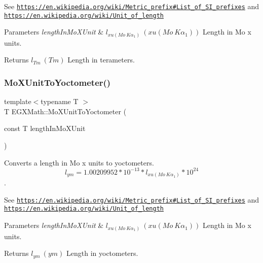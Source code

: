 See \href{https://en.wikipedia.org/wiki/Metric_prefix#List_of_SI_prefixes}{\tt https\+://en.\+wikipedia.\+org/wiki/\+Metric\+\_\+prefix\#\+List\+\_\+of\+\_\+\+S\+I\+\_\+prefixes} and \href{https://en.wikipedia.org/wiki/Unit_of_length}{\tt https\+://en.\+wikipedia.\+org/wiki/\+Unit\+\_\+of\+\_\+length} 
\begin{DoxyParams}{Parameters}
{\em length\+In\+Mo\+X\+Unit} & $ l_{xu(Mo\ K\alpha_1)}\ (xu(Mo\ K\alpha_1))$ Length in Mo x units. \\
\hline
\end{DoxyParams}
\begin{DoxyReturn}{Returns}
$ l_{Tm}\ (Tm)$ Length in terameters. 
\end{DoxyReturn}
\mbox{\label{group___e_g_x_math-_conversions-_length_conversions-_non-_s_i-_mo_x_unit-_s_i_gadfb737fe68fc22991e2c7616212480b6}} 
\subsubsection{\texorpdfstring{Mo\+X\+Unit\+To\+Yoctometer()}{MoXUnitToYoctometer()}}
{\footnotesize\ttfamily template$<$typename T $>$ \\
T E\+G\+X\+Math\+::\+Mo\+X\+Unit\+To\+Yoctometer (\begin{DoxyParamCaption}\item[{const T}]{length\+In\+Mo\+X\+Unit }\end{DoxyParamCaption})}



Converts a length in Mo x units to yoctometers. \[ l_{ym}=1.00209952*10^{-13} * l_{xu(Mo\ K\alpha_1)} * 10^{24} \]. 

See \href{https://en.wikipedia.org/wiki/Metric_prefix#List_of_SI_prefixes}{\tt https\+://en.\+wikipedia.\+org/wiki/\+Metric\+\_\+prefix\#\+List\+\_\+of\+\_\+\+S\+I\+\_\+prefixes} and \href{https://en.wikipedia.org/wiki/Unit_of_length}{\tt https\+://en.\+wikipedia.\+org/wiki/\+Unit\+\_\+of\+\_\+length} 
\begin{DoxyParams}{Parameters}
{\em length\+In\+Mo\+X\+Unit} & $ l_{xu(Mo\ K\alpha_1)}\ (xu(Mo\ K\alpha_1))$ Length in Mo x units. \\
\hline
\end{DoxyParams}
\begin{DoxyReturn}{Returns}
$ l_{ym}\ (ym)$ Length in yoctometers. 
\end{DoxyReturn}
\mbox{\label{group___e_g_x_math-_conversions-_length_conversions-_non-_s_i-_mo_x_unit-_s_i_ga4924e06e3105b90d3d383bce75466c65}} 
